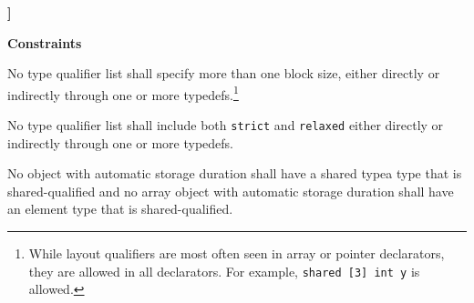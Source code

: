 \hspace{3em}{\em ( declarator )}




\hspace{3em}{\em direct-declarator {\bf [} type-qualifier-list$_{opt}$ }
                 {\bf * ]}







\hspace{3em}{\em type-qualifier}

\hspace{3em}{\em type-qualifier-list type-qualifier}

{\bf Constraints} 

\np No type qualifier list shall specify more than one block
    size, either directly or indirectly through one or more
    typedefs.\footnote{While layout qualifiers are most often seen in
    array or pointer declarators, they are allowed in all declarators.  For
    example, {\tt shared [3] int y} is allowed.}

\np No type qualifier list shall include both {\tt strict}
    and {\tt relaxed} either directly or indirectly through one or
    more typedefs.

\np No object with automatic storage duration shall have 
    {a shared type}{a type
    that is shared-qualified and no array object with automatic
    storage duration shall have an element type that is shared-qualified}.

